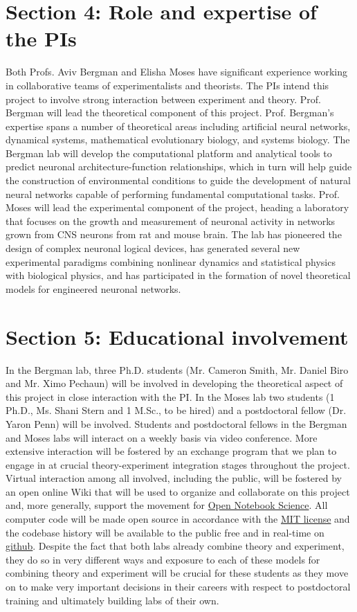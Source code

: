 \section{Section 4: Role and expertise of the PIs}
Both Profs. Aviv Bergman and Elisha Moses have significant experience working in collaborative teams of experimentalists and theorists. The PIs intend this project to involve strong interaction between experiment and theory. Prof. Bergman will lead the theoretical component of this project. Prof. Bergman's expertise spans a number of theoretical areas including artificial neural networks, dynamical systems, mathematical evolutionary biology, and systems biology. The Bergman lab will develop the computational platform and analytical tools to predict neuronal architecture-function relationships, which in turn will help guide the construction of environmental conditions to guide the development of natural neural networks capable of performing fundamental computational tasks. Prof. Moses will lead the experimental component of the project, heading a laboratory that focuses on the growth and measurement of neuronal activity in networks grown from CNS neurons from rat and mouse brain. The lab has pioneered the design of complex neuronal logical devices, has generated several new experimental paradigms combining nonlinear dynamics and statistical physics with biological physics, and has participated in the formation of novel theoretical models for engineered neuronal networks.

\section{Section 5: Educational involvement}
In the Bergman lab, three Ph.D. students (Mr. Cameron Smith, Mr. Daniel Biro and Mr. Ximo Pechaun) will be involved in developing the theoretical aspect of this project in close interaction with the PI. In the Moses lab two students (1 Ph.D., Ms. Shani Stern and 1 M.Sc., to be hired) and a postdoctoral fellow (Dr. Yaron Penn) will be involved. Students and postdoctoral fellows in the Bergman and Moses labs will interact on a weekly basis via video conference. More extensive interaction will be fostered by an exchange program that we plan to engage in at crucial theory-experiment integration stages throughout the project. Virtual interaction among all involved, including the public, will be fostered by an open online Wiki that will be used to organize and collaborate on this project and, more generally, support the movement for \href{http://en.wikipedia.org/wiki/Open\_notebook\_science}{Open Notebook Science}. All computer code will be made open source in accordance with the \href{http://opensource.org/licenses/MIT}{MIT license} and the codebase history will be available to the public free and in real-time on \href{http://www.github.com}{github}. Despite the fact that both labs already combine theory and experiment, they do so in very different ways and exposure to each of these models for combining theory and experiment will be crucial for these students as they move on to make very important decisions in their careers with respect to postdoctoral training and ultimately building labs of their own.